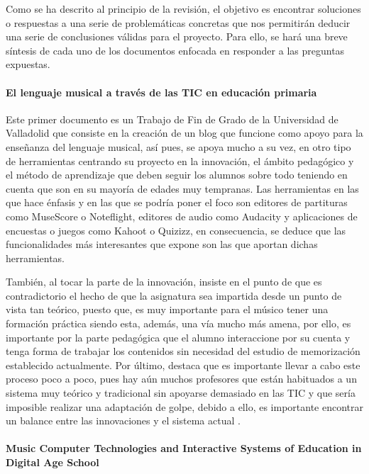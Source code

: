 Como se ha descrito al principio de la revisión, el objetivo es encontrar soluciones o respuestas a una serie de problemáticas concretas que nos permitirán deducir una serie de conclusiones válidas para el proyecto. Para ello, se hará una breve síntesis de cada uno de los documentos enfocada en responder a las preguntas expuestas.

\paragraph{El lenguaje musical a través de las TIC en educación primaria}

Este primer documento es un Trabajo de Fin de Grado de la Universidad de Valladolid que consiste en la creación de un blog que funcione como apoyo para la enseñanza del lenguaje musical, así pues, se apoya mucho a su vez, en otro tipo de herramientas centrando su proyecto en la innovación, el ámbito pedagógico y el método de aprendizaje que deben seguir los alumnos sobre todo teniendo en cuenta que son en su mayoría de edades muy tempranas. Las herramientas en las que hace énfasis y en las que se podría poner el foco son editores de partituras como MuseScore o Noteflight, editores de audio como Audacity y aplicaciones de encuestas o juegos como Kahoot o Quizizz, en consecuencia, se deduce que las funcionalidades más interesantes que expone son las que aportan dichas herramientas.

También, al tocar la parte de la innovación, insiste en el punto de que es contradictorio el hecho de que la asignatura sea impartida desde un punto de vista tan teórico, puesto que, es muy importante para el músico tener una formación práctica siendo esta, además, una vía mucho más amena, por ello, es importante por la parte pedagógica que el alumno interaccione por su cuenta y tenga forma de trabajar los contenidos sin necesidad del estudio de memorización establecido actualmente. Por último, destaca que es importante llevar a cabo este proceso poco a poco, pues hay aún muchos profesores que están habituados a un sistema muy teórico y tradicional sin apoyarse demasiado en las TIC y que sería imposible realizar una adaptación de golpe, debido a ello, es importante encontrar un balance entre las innovaciones y el sistema actual \cite{RodriguezHeras2022}.

\paragraph{Music Computer Technologies and Interactive Systems of Education in Digital Age School}

